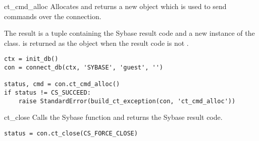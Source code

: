 \begin{methoddesc}[CS_CONNECTION]{ct_cmd_alloc}{}
Allocates and returns a new  object which is used to
send commands over the connection.

The result is a tuple containing the Sybase result code and a new
instance of the  class.  is returned as
the  object when the result code is not
.

\begin{verbatim}
ctx = init_db()
con = connect_db(ctx, 'SYBASE', 'guest', '')

status, cmd = con.ct_cmd_alloc()
if status != CS_SUCCEED:
    raise StandardError(build_ct_exception(con, 'ct_cmd_alloc'))
\end{verbatim}
\end{methoddesc}

\begin{methoddesc}[CS_CONNECTION]{ct_close}{}
Calls the Sybase  function and returns the Sybase
result code.

\begin{verbatim}
status = con.ct_close(CS_FORCE_CLOSE)
\end{verbatim}
\end{methoddesc}

